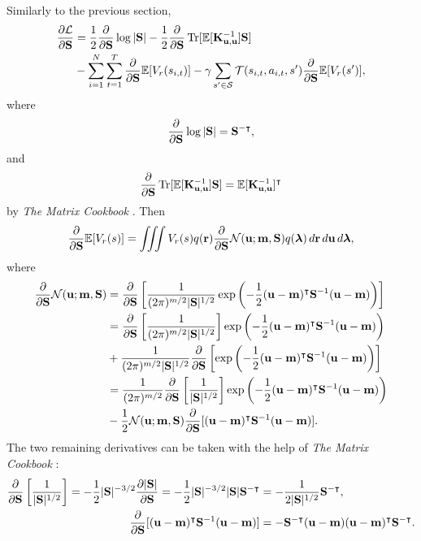 \documentclass{mprop}
\theoremstyle{definition}
\DeclareMathOperator{\Tr}{Tr}
\begin{document}
Similarly to the previous section,
\[
  \begin{split}
    \frac{\partial\mathcal{L}}{\partial\mathbf{S}} &=
    \frac{1}{2}\dS\log|\mathbf{S}|
    -\frac{1}{2}\dS\Tr[\mathbb{E}[\Kuu^{-1}]\mathbf{S}] \\
    &- \sum_{i=1}^N \sum_{t=1}^T \dS\mathbb{E}[V_r(s_{i,t})] -
      \gamma\sum_{s' \in \mathcal{S}} \mathcal{T}(s_{i,t}, a_{i,t},
      s')\dS\mathbb{E}[V_r(s')],
  \end{split}
\]
where
\[ \frac{\partial}{\partial\mathbf{S}}\log|\mathbf{S}| = \mathbf{S}^{-\intercal}, \]
and
\[ \dS\Tr[\mathbb{E}[\Kuu^{-1}]\mathbf{S}] = \mathbb{E}[\Kuu^{-1}]^\intercal \]
by \emph{The Matrix Cookbook} \cite{petersen2008matrix}. Then
\[ \frac{\partial}{\partial\mathbf{S}}\mathbb{E}[V_r(s)] = \iiint V_r(s) q(\mathbf{r}) \frac{\partial}{\partial\mathbf{S}}\mathcal{N}(\mathbf{u}; \mathbf{m}, \mathbf{S})
  q(\bm\lambda)\,d\mathbf{r}\,d\mathbf{u}\,d\bm\lambda, \]
where
\[
  \begin{split}
    \frac{\partial}{\partial\mathbf{S}}\mathcal{N}(\mathbf{u}; \mathbf{m}, \mathbf{S}) &=
    \frac{\partial}{\partial\mathbf{S}}\left[\frac{1}{(2\pi)^{m/2}|\mathbf{S}|^{1/2}}\exp \left( -\frac{1}{2}
        (\mathbf{u} - \mathbf{m})^\intercal\mathbf{S}^{-1}(\mathbf{u} -
        \mathbf{m})\right)\right] \\
    &= \frac{\partial}{\partial\mathbf{S}}\left[\frac{1}{(2\pi)^{m/2}|\mathbf{S}|^{1/2}}\right]\exp \left( -\frac{1}{2}
        (\mathbf{u} - \mathbf{m})^\intercal\mathbf{S}^{-1}(\mathbf{u} -
        \mathbf{m})\right) \\
      &+ \frac{1}{(2\pi)^{m/2}|\mathbf{S}|^{1/2}}\frac{\partial}{\partial\mathbf{S}}\left[\exp\left( -\frac{1}{2}
        (\mathbf{u} - \mathbf{m})^\intercal\mathbf{S}^{-1}(\mathbf{u} -
        \mathbf{m})\right)\right] \\
    &=
    \frac{1}{(2\pi)^{m/2}}\frac{\partial}{\partial\mathbf{S}}\left[\frac{1}{|\mathbf{S}|^{1/2}}\right]\exp
    \left( -\frac{1}{2} (\mathbf{u} -
      \mathbf{m})^\intercal\mathbf{S}^{-1}(\mathbf{u} - \mathbf{m})\right) \\
    &- \frac{1}{2}\mathcal{N}(\mathbf{u}; \mathbf{m}, \mathbf{S})\frac{\partial}{\partial\mathbf{S}}[(\mathbf{u}
    - \mathbf{m})^\intercal\mathbf{S}^{-1}(\mathbf{u} - \mathbf{m})]. \\
  \end{split}
\]
The two remaining derivatives can be taken with the help of \emph{The Matrix
  Cookbook} \cite{petersen2008matrix}:
\begin{align*}
  \frac{\partial}{\partial\mathbf{S}}\left[\frac{1}{|\mathbf{S}|^{1/2}}\right] =
  -\frac{1}{2}|\mathbf{S}|^{-3/2}\frac{\partial |\mathbf{S}|}{\partial \mathbf{S}} =
  -\frac{1}{2}|\mathbf{S}|^{-3/2}|\mathbf{S}|\mathbf{S}^{-\intercal} &=
  -\frac{1}{2|\mathbf{S}|^{1/2}}\mathbf{S}^{-\intercal}, \\
  \frac{\partial}{\partial\mathbf{S}}[(\mathbf{u} - \mathbf{m})^\intercal\mathbf{S}^{-1}(\mathbf{u} -
  \mathbf{m})] &= -\mathbf{S}^{-\intercal}(\mathbf{u} - \mathbf{m})(\mathbf{u} -
  \mathbf{m})^\intercal\mathbf{S}^{-\intercal}.
\end{align*}
\end{document}
